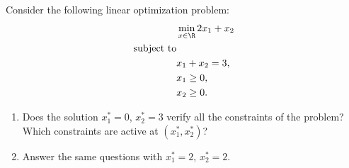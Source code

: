 
Consider the following linear optimization problem:
\begin{align*}
 & \min_{x \in \R} 2 x_1 + x_2 \\
 \text{subject to} & \\
 & x_1 + x_2 = 3, \\
 & x_1 \geq 0, \\
 & x_2 \geq 0.
\end{align*}

\begin{enumerate}
    \item Does the solution $x_1^* = 0$, $x_2^* = 3$ verify all the constraints of the problem? Which constraints are active at $(x_1^*, x_2^*)$?
    \item Answer the same questions with $x_1^* = 2$, $x_2^* = 2$.
\end{enumerate}



